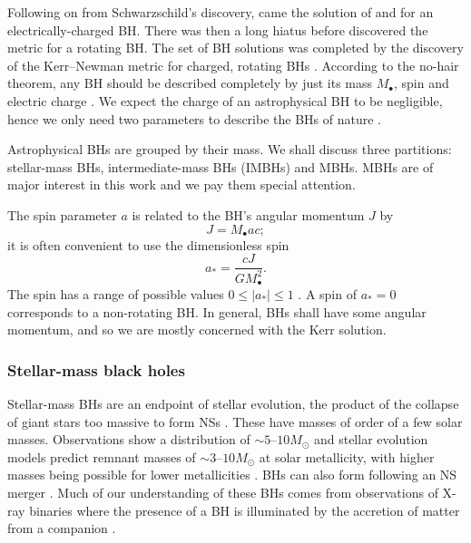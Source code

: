 Following on from Schwarzschild's discovery, came the solution of \citet{Reissner1916} and \citet{Nordstrom1918} for an electrically-charged BH. There was then a long hiatus before \citet{Kerr1963} discovered the metric for a rotating BH. The set of BH solutions was completed by the discovery of the Kerr--Newman metric for charged, rotating BHs \citep{Newman1965}. According to the no-hair theorem, any BH should be described completely by just its mass $M_\bullet$, spin and electric charge \citep{Israel1967, Israel1968, Carter1971, Hawking1972, Robinson1975}. We expect the charge of an astrophysical BH to be negligible, hence we only need two parameters to describe the BHs of nature \citep[sections 36, 51]{Chandrasekhar1992}.

Astrophysical BHs are grouped by their mass. We shall discuss three partitions: stellar-mass BHs, intermediate-mass BHs (IMBHs) and MBHs. MBHs are of major interest in this work and we pay them special attention.

The spin parameter $a$ is related to the BH's angular momentum $J$ by
\begin{equation}
J = M_\bullet ac;
\end{equation}
it is often convenient to use the dimensionless spin
\begin{equation}
a_\ast = \dfrac{cJ}{GM_\bullet^2}.
\end{equation}
The spin has a range of possible values $0 \leq |a_\ast| \leq 1$ \cite[section 66]{Chandrasekhar1992}. A spin of $a_\ast = 0$ corresponds to a non-rotating BH. In general, BHs shall have some angular momentum, and so we are mostly concerned with the Kerr solution.

\subsubsection{Stellar-mass black holes}

Stellar-mass BHs are an endpoint of stellar evolution, the product of the collapse of giant stars too massive to form NSs \citep{Postnov2006}. These have masses of order of a few solar masses. Observations show a distribution of $\sim5$--$10M_\odot$ \citep{Ozel2010,Farr2010} and stellar evolution models predict remnant masses of $\sim3$--$10M_\odot$ at solar metallicity, with higher masses being possible for lower metallicities \citep{Woosley2002}. BHs can also form following an NS merger \citep{Rezzolla2011,Faber2012}. Much of our understanding of these BHs comes from observations of X-ray binaries where the presence of a BH is illuminated by the accretion of matter from a companion \citep{Shakura1973,Remillard2006}.


